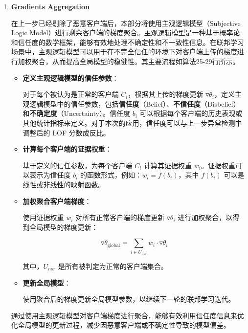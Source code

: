 \documentclass[lettersize,journal]{IEEEtran}
\begin{document}
\begin{enumerate}
\item \textbf{Gradients Aggregation}

在上一步已经剔除了恶意客户端后，本部分将使用主观逻辑模型（Subjective Logic Model）进行剩余客户端的梯度聚合。主观逻辑模型是一种基于概率论和信任度的数学框架，能够有效地处理不确定性和不一致性信息。在联邦学习场景中，主观逻辑模型可以用于在不完全信任的环境下对客户端上传的梯度进行加权聚合，从而提高全局模型的稳健性。其主要流程如算法25-29行所示。

\begin{itemize}
    \item \textbf{定义主观逻辑模型的信任参数}：

    对于每个被认为是正常的客户端 \( C_i \)，根据其上传的梯度更新 \( \triangledown \theta_i \)，定义主观逻辑模型中的信任参数，包括\textbf{信任度}（Belief）、\textbf{不信任度}（Disbelief）和\textbf{不确定度}（Uncertainty）。信任度 \( b_i \) 可以根据每个客户端的历史表现或其他统计指标来定义。对于本次的应用，信任度可以与上一步异常检测中调整后的 LOF 分数成反比。

    \item \textbf{计算每个客户端的证据权重}：

    基于定义的信任参数，为每个客户端 \( C_i \) 计算其证据权重 \( w_i \)。证据权重可以表示为信任度 \( b_i \) 的函数形式，例如：\( w_i = f(b_i) \)，其中 \( f(b_i) \) 可以是线性或非线性的映射函数。

    \item \textbf{加权聚合客户端梯度}：

    使用证据权重 \( w_i \) 对所有正常客户端的梯度更新 \( \triangledown \theta_i \) 进行加权聚合，以得到全局模型的梯度更新：

    \begin{equation}
    \triangledown \theta_{\text{global}} = \sum_{i \in U_{nor}} w_i \cdot \triangledown \theta_i
    \end{equation}

    其中，\( U_{nor} \) 是所有被判定为正常的客户端集合。

    \item \textbf{更新全局模型}：

    使用聚合后的梯度更新全局模型参数，以继续下一轮的联邦学习迭代。
\end{itemize}

通过使用主观逻辑模型对客户端梯度进行聚合，能够有效利用信任度信息来优化全局模型的更新过程，减少因恶意客户端或不确定性导致的模型偏差。
\end{enumerate}

\end{document}

